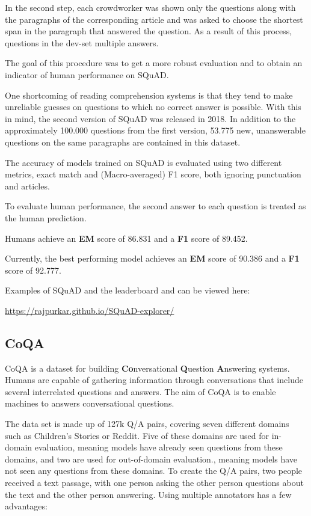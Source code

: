 \documentclass[]{krantz}
\begin{document}
In the second step, each crowdworker was shown only the questions along with the paragraphs of the corresponding article and was asked to choose the shortest span in the paragraph that answered the question. As a result of this process, questions in the dev-set multiple answers.

The goal of this procedure was to get a more robust evaluation and to obtain an indicator of human performance on SQuAD.

One shortcoming of reading comprehension systems is that they tend to make unreliable guesses on questions to which no correct answer is possible. With this in mind, the second version of SQuAD was released in 2018. In addition to the approximately 100.000 questions from the first version, 53.775 new, unanswerable questions on the same paragraphs are contained in this dataset.

The accuracy of models trained on SQuAD is evaluated using two different metrics, exact match and (Macro-averaged) F1 score, both ignoring punctuation and articles.

To evaluate human performance, the second answer to each question is treated as the human prediction. \citep{rajpurkar2016squad, rajpurkar2018know}

Humans achieve an \textbf{EM} score of 86.831 and a \textbf{F1} score of 89.452.

Currently, the best performing model achieves an \textbf{EM} score of 90.386 and a \textbf{F1} score of 92.777.

Examples of SQuAD and the leaderboard and can be viewed here:

\center \url{https://rajpurkar.github.io/SQuAD-explorer/}

\flushleft

\hypertarget{coqa}{%
\subsection{CoQA}\label{coqa}}

CoQA is a dataset for building \textbf{Co}nversational \textbf{Q}uestion \textbf{A}nswering systems. Humans are capable of gathering information through conversations that include several interrelated questions and answers. The aim of CoQA is to enable machines to answers conversational questions.

The data set is made up of 127k Q/A pairs, covering seven different domains such as Children's Stories or Reddit. Five of these domains are used for in-domain evaluation, meaning models have already seen questions from these domains, and two are used for out-of-domain evaluation., meaning models have not seen any questions from these domains. To create the Q/A pairs, two people received a text passage, with one person asking the other person questions about the text and the other person answering. Using multiple annotators has a few advantages:
\end{document}

